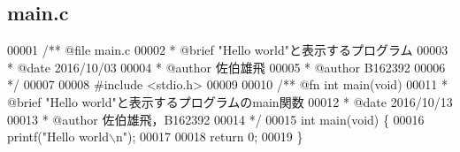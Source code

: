 \subsection{main.\-c}

\begin{DoxyCode}
00001 \textcolor{comment}{/**  @file main.c}
00002 \textcolor{comment}{ *   @brief "Hello world"と表示するプログラム}
00003 \textcolor{comment}{ *   @date   2016/10/03}
00004 \textcolor{comment}{ *   @author 佐伯雄飛}
00005 \textcolor{comment}{ *   @author B162392}
00006 \textcolor{comment}{ */}
00007 
00008 \textcolor{preprocessor}{#include <stdio.h>}
00009 \textcolor{comment}{}
00010 \textcolor{comment}{/** @fn int main(void)}
00011 \textcolor{comment}{ *  @brief "Hello world"と表示するプログラムのmain関数}
00012 \textcolor{comment}{ *  @date   2016/10/13}
00013 \textcolor{comment}{ *  @author 佐伯雄飛，B162392}
00014 \textcolor{comment}{ */}
00015 \textcolor{keywordtype}{int} main(\textcolor{keywordtype}{void}) \{
00016   printf(\textcolor{stringliteral}{"Hello world\(\backslash\)n"});
00017 
00018   \textcolor{keywordflow}{return} 0;
00019 \}
\end{DoxyCode}
